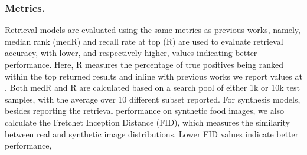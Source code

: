 \documentclass[sigconf,nonacm]{acmart}
\begin{document}
\subsubsection*{\textbf{Metrics.}} Retrieval models are evaluated using the same metrics as previous works, namely, median rank (medR) and recall rate at top  (R) are used to evaluate retrieval accuracy, with lower, and respectively higher, values indicating better performance. Here, R measures the percentage of true positives being ranked within the top  returned results and inline with previous works we report values at . Both medR and R are calculated based on a search pool of either 1k or 10k test samples, with the average over 10 different subset reported. For synthesis models, besides reporting the retrieval performance on synthetic food images, we also calculate the Fretchet Inception Distance (FID), which measures the similarity between real and synthetic image distributions. Lower FID values indicate better performance,
\end{document}
